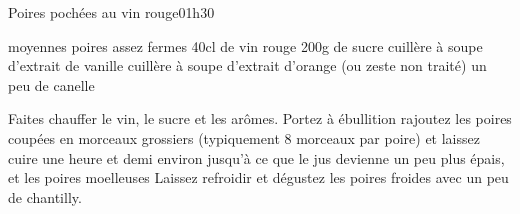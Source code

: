 \begin{recette}{Poires pochées au vin rouge}{0}{1h30}{}
\begin{ingredients}
 moyennes poires assez fermes
\ingredient 40cl de vin rouge
\ingredient 200g de sucre
 cuillère à soupe d'extrait de vanille
 cuillère à soupe d'extrait d'orange (ou zeste non traité)
\ingredient un peu de canelle
\end{ingredients}

\begin{preparation}
\etape Faites chauffer le vin, le sucre et les arômes. Portez à ébullition
\etape rajoutez les poires coupées en morceaux grossiers (typiquement 8 morceaux par poire) et laissez cuire une heure et demi environ jusqu'à ce que le jus devienne un peu plus épais, et les poires moelleuses
\etape Laissez refroidir et dégustez les poires froides avec un peu de chantilly.
\end{preparation}

\end{recette}

